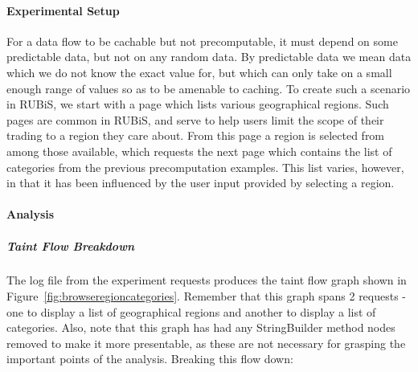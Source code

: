 \documentclass[msc,oneside]{ubcthesis}
\begin{document}
\paragraph{Experimental Setup}
For a data flow to be cachable but not precomputable, it must depend on some predictable data, but not on any random data. By predictable data we mean data which we do not know the exact value for, but which can only take on a small enough range of values so as to be amenable to caching. To create such a scenario in RUBiS, we start with a page which lists various geographical regions. Such pages are common in RUBiS, and serve to help users limit the scope of their trading to a region they care about. From this page a region is selected from among those available, which requests the next page which contains the list of categories from the previous precomputation examples. This list varies, however, in that it has been influenced by the user input provided by selecting a region.

\paragraph{Analysis}
\subparagraph{Taint Flow Breakdown}
The log file from the experiment requests produces the taint flow graph shown in Figure~\ref{fig:browseregioncategories}. Remember that this graph spans 2 requests - one to display a list of geographical regions and another to display a list of categories. Also, note that this graph has had any StringBuilder method nodes removed to make it more presentable, as these are not necessary for grasping the important points of the analysis. Breaking this flow down:
\end{document}
